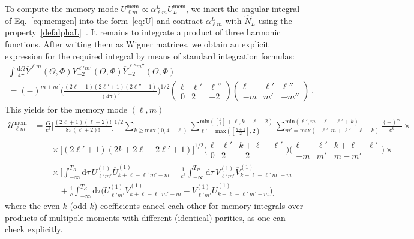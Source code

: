 \documentclass[prd,preprint,superscriptaddress,tightenlines,nofootinbib,
  eqsecnum,showpacs]{revtex4}
\newcommand{\ud}{\mathrm{d}}
\newcommand{\ui}{\mathrm{i}}
\begin{document}
To compute the memory mode $U_{\ell m}^\text{mem}\propto
\alpha^L_{\ell m} U_L^\text{mem}$, we insert the angular integral of
Eq.~\eqref{eq:memgen} into the form~\eqref{eq:U} and contract
$\alpha^L_{\ell m}$ with $\hat{N}_L$ using the
property~\eqref{defalphaL}~\cite{F09}. It remains to integrate a
product of three harmonic functions. After writing them as Wigner
matrices, we obtain an explicit expression for the required integral
by means of standard integration formulas:
%
\begin{multline}
\int \frac{\ud \Omega}{4\pi} \overline{Y}^{\ell m}(\Theta,\Phi)
Y^{\ell' m'}_{-2}(\Theta,\Phi) \overline{Y}^{\ell''
  m''}_{-2}(\Theta,\Phi) \\= (-)^{m+m'}
\Big(\frac{(2\ell+1)(2\ell'+1)(2\ell''+1)}{(4\pi)^3}\Big)^{1/2} \left(
\begin{array}{ccc}
\ell & \ell' & \ell'' \\
0 & 2 & -2 
\end{array}
\right) \left(
\begin{array}{ccc}
\ell & \ell' & \ell'' \\
-m & m' & -m'' 
\end{array}
\right) \, .
\end{multline}
%
This yields for the memory mode $(\ell,m)$
%
\begin{align}
\mathcal{U}_{\ell m}^\text{mem} &= \frac{G}{c^3}
\Big[\frac{(2\ell+1)(\ell-2)!}{8\pi (\ell +2)!} \Big]^{1/2} \! \! \!
\!  \sum_{k \geqslant \text{max}(0,4-\ell)}
\sum_{\ell'=\text{max}([\frac{k+1}{2}],2)}^{\text{min}([\frac{k}{2}]+\ell,k+\ell-2)}
\sum_{m'=
  \text{max}(-\ell',m+\ell'-\ell-k)}^{\text{min}(\ell',m+\ell-\ell'+k)}
\frac{(-)^{m'}}{c^k} \times \nonumber \\ & \qquad \times
\bigl[(2\ell'+1)(2k+2\ell-2\ell'+1)\bigr]^{1/2}
\bigg(\begin{array}{ccc} \ell & \ell' & k + \ell - \ell' \\ 0 & 2 &
  -2 \end{array} \bigg) \bigg(\begin{array}{ccc} \ell & \ell' & k +
  \ell - \ell' \\ -m & m' & m-m' \end{array} \bigg) \times \nonumber
\\ & \qquad \times \Big[ \int_{-\infty}^{T_R} \ud\tau \,
  U^{(1)}_{\ell' m'} \overline{U}^{(1)}_{k+\ell-\ell'\, m'-m} +
  \frac{1}{c^2} \int_{-\infty}^{T_R} \ud\tau \, V^{(1)}_{\ell' m'}
  \overline{V}^{(1)}_{k+\ell-\ell'\, m'-m} \nonumber \\ & \qquad \quad
  + \frac{\ui}{c} \int_{-\infty}^{T_R} \ud\tau \bigl(U^{(1)}_{\ell'
    m'} \overline{V}^{(1)}_{k+\ell-\ell'\, m'-m}- V^{(1)}_{\ell' m'}
  \overline{U}^{(1)}_{k+\ell-\ell'\, m'-m}\bigr) \Big]
\end{align}
%
where the even-$k$ (odd-$k$) coefficients cancel each other for memory
integrals over products of multipole moments with different
(identical) parities, as one can check explicitly.


\end{document}
